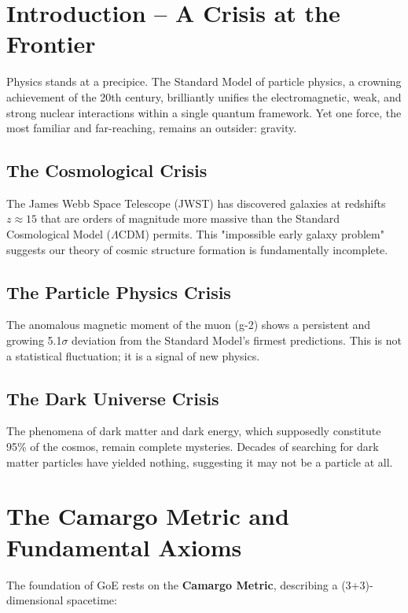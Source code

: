 \documentclass[12pt,a4paper]{article}
\theoremstyle{definition}
\begin{document}
\section{Introduction – A Crisis at the Frontier}

Physics stands at a precipice. The Standard Model of particle physics, a crowning achievement of the 20th century, brilliantly unifies the electromagnetic, weak, and strong nuclear interactions within a single quantum framework. Yet one force, the most familiar and far-reaching, remains an outsider: gravity.

\subsection{The Cosmological Crisis}

The James Webb Space Telescope (JWST) has discovered galaxies at redshifts $z \approx 15$ that are orders of magnitude more massive than the Standard Cosmological Model ($\Lambda$CDM) permits. This "impossible early galaxy problem" suggests our theory of cosmic structure formation is fundamentally incomplete.

\subsection{The Particle Physics Crisis}

The anomalous magnetic moment of the muon (g-2) shows a persistent and growing 5.1$\sigma$ deviation from the Standard Model's firmest predictions. This is not a statistical fluctuation; it is a signal of new physics.

\subsection{The Dark Universe Crisis}

The phenomena of dark matter and dark energy, which supposedly constitute 95\% of the cosmos, remain complete mysteries. Decades of searching for dark matter particles have yielded nothing, suggesting it may not be a particle at all.


\section{The Camargo Metric and Fundamental Axioms}

The foundation of GoE rests on the \textbf{Camargo Metric}, describing a (3+3)-dimensional spacetime:
\end{document}

